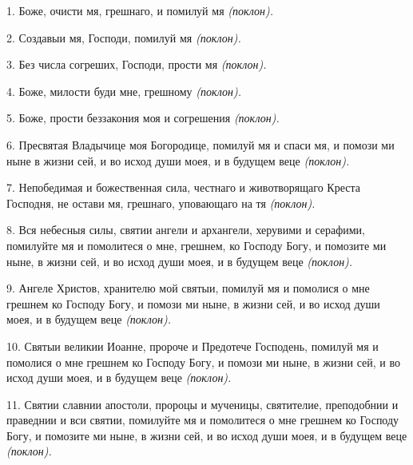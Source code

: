 1. Боже, очисти мя, грешнаго, и помилуй мя \itshape (поклон)\normalfont{}.
     


2. Создавыи мя, Господи, помилуй мя \itshape (поклон)\normalfont{}.
     


3. Без числа согреших, Господи, прости мя \itshape (поклон)\normalfont{}.
     


4. Боже, милости буди мне, грешному \itshape (поклон)\normalfont{}.
     


5. Боже, прости беззакония моя и согрешения \itshape (поклон)\normalfont{}.
     


6. Пресвятая Владычице моя Богородице, помилуй мя и спаси мя, и
     помози ми ныне в жизни сей, и во исход души моея, и в будущем
     веце \itshape (поклон)\normalfont{}.
     


7. Непобедимая  и  божественная  сила,  честнаго  и  животворящаго
     Креста  Господня,  не  остави  мя,  грешнаго,  уповающаго  на  тя
     \itshape (поклон)\normalfont{}.
     


8. Вся  небесныя  силы,  святии  ангели  и  архангели,  херувими  и
     серафими, помилуйте мя и помолитеся о мне, грешнем, ко Господу
     Богу, и помозите ми ныне, в жизни сей, и во исход души моея, и в
     будущем веце \itshape (поклон)\normalfont{}.

     


9. Ангеле Христов, хранителю мой святыи, помилуй мя и помолися
     о мне грешнем ко Господу Богу, и помози ми ныне, в жизни сей, и
     во исход души моея, и в будущем веце \itshape (поклон)\normalfont{}.
     


10. Святыи великии Иоанне, пророче и Предотече Господень, помилуй
     мя и помолися о мне грешнем ко Господу Богу, и помози ми ныне,
     в жизни сей, и во исход души моея, и в будущем веце \itshape (поклон)\normalfont{}.
     


11. Святии  славнии  апостоли,  пророцы  и  мученицы,  святителие,
     преподобнии и праведнии и вси святии, помилуйте мя и помолитеся
     о мне грешнем ко Господу Богу, и помозите ми ныне, в жизни сей,
     и во исход души моея, и в будущем веце \itshape (поклон)\normalfont{}.
     


